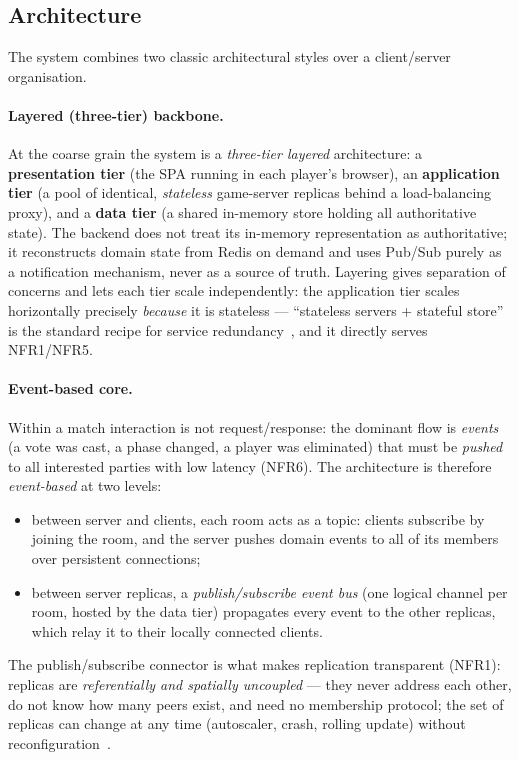 \documentclass{scrartcl}
\begin{document}
\subsection{Architecture}\label{architecture}

The system combines two classic architectural styles over a client/server
organisation.

\paragraph{Layered (three-tier) backbone.}
At the coarse grain the system is a \emph{three-tier layered} architecture: a
\textbf{presentation tier} (the SPA running in each player's browser), an
\textbf{application tier} (a pool of identical, \emph{stateless} game-server
replicas behind a load-balancing proxy), and a \textbf{data tier} (a shared
in-memory store holding all authoritative state). The backend does not treat its
in-memory representation as authoritative; it reconstructs domain state from
Redis on demand and uses Pub/Sub purely as a notification mechanism, never as a
source of truth. Layering gives separation of concerns and lets each tier scale
independently: the application tier scales horizontally precisely \emph{because}
it is stateless --- ``stateless servers + stateful store'' is the standard recipe
for service redundancy~\cite{kleppmann2017designing}, and it directly serves
NFR1/NFR5.

\paragraph{Event-based core.}
Within a match interaction is not request/response: the dominant flow is
\emph{events} (a vote was cast, a phase changed, a player was eliminated) that
must be \emph{pushed} to all interested parties with low latency (NFR6). The
architecture is therefore \emph{event-based} at two levels:
\begin{itemize}
      \item between server and clients, each room acts as a topic: clients subscribe
            by joining the room, and the server pushes domain events to all of its members
            over persistent connections;
      \item between server replicas, a \emph{publish/subscribe event bus} (one
            logical channel per room, hosted by the data tier) propagates every event to
            the other replicas, which relay it to their locally connected clients.
\end{itemize}
The publish/subscribe connector is what makes replication transparent (NFR1):
replicas are \emph{referentially and spatially uncoupled} --- they never address
each other, do not know how many peers exist, and need no membership protocol;
the set of replicas can change at any time (autoscaler, crash, rolling update)
without reconfiguration~\cite{tanenbaum2017distributed}.
\end{document}
